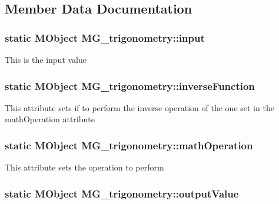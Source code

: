 \subsection{Member Data Documentation}
\hypertarget{class_m_g__trigonometry_adf95381a397ca646e37a524dd4bae7fb}{
\subsubsection[{input}]{\setlength{\rightskip}{0pt plus 5cm}static M\-Object M\-G\-\_\-trigonometry\-::input\hspace{0.3cm}{\ttfamily [static]}}}\label{class_m_g__trigonometry_adf95381a397ca646e37a524dd4bae7fb}
This is the input value \hypertarget{class_m_g__trigonometry_a92903c06ebef107b71b93812c7c358e3}{
\subsubsection[{inverse\-Function}]{\setlength{\rightskip}{0pt plus 5cm}static M\-Object M\-G\-\_\-trigonometry\-::inverse\-Function\hspace{0.3cm}{\ttfamily [static]}}}\label{class_m_g__trigonometry_a92903c06ebef107b71b93812c7c358e3}
This attribute sets if to perform the inverse operation of the one set in the math\-Operation attribute \hypertarget{class_m_g__trigonometry_a6be2c3fb2cfe5e7609eef7cd52802d6b}{
\subsubsection[{math\-Operation}]{\setlength{\rightskip}{0pt plus 5cm}static M\-Object M\-G\-\_\-trigonometry\-::math\-Operation\hspace{0.3cm}{\ttfamily [static]}}}\label{class_m_g__trigonometry_a6be2c3fb2cfe5e7609eef7cd52802d6b}
This attribute sets the operation to perform \hypertarget{class_m_g__trigonometry_adde1f2175ff171bb94b96d6c3273f180}{
\subsubsection[{output\-Value}]{\setlength{\rightskip}{0pt plus 5cm}static M\-Object M\-G\-\_\-trigonometry\-::output\-Value\hspace{0.3cm}{\ttfamily [static]}}}\label{class_m_g__trigonometry_adde1f2175ff171bb94b96d6c3273f180}
